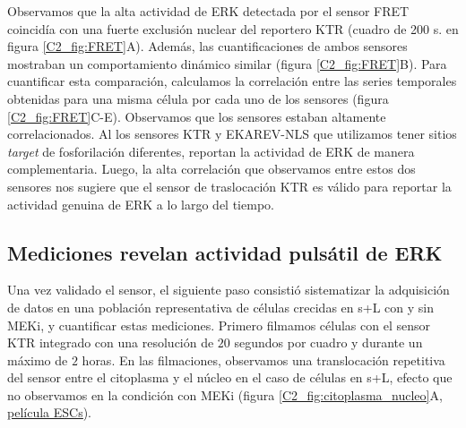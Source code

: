 \documentclass[./main.tex]{subfiles}
\begin{document}
Observamos que la alta actividad de ERK detectada por el sensor FRET coincidía con una fuerte exclusión nuclear del reportero KTR (cuadro de 200 s. en figura \ref{C2_fig:FRET}A). Además, las cuantificaciones de ambos sensores mostraban un comportamiento dinámico similar (figura \ref{C2_fig:FRET}B). Para cuantificar esta comparación, calculamos la correlación entre las series temporales obtenidas para una misma célula por cada uno de los sensores (figura \ref{C2_fig:FRET}C-E). Observamos que los sensores estaban altamente correlacionados. Al los sensores KTR y EKAREV-NLS que utilizamos tener sitios \textit{target} de fosforilación diferentes, reportan la actividad de ERK de manera complementaria. Luego, la alta correlación que observamos entre estos dos sensores nos sugiere que el sensor de traslocación KTR es válido para reportar la actividad genuina de ERK a lo largo del tiempo.  


\subsection{Mediciones revelan actividad pulsátil de ERK}
\label{C2_ssec:tracking}

Una vez validado el sensor, el siguiente paso consistió sistematizar la adquisición de datos en una población representativa de células crecidas en s+L con y sin MEKi, y cuantificar estas mediciones. Primero filmamos células con el sensor KTR integrado con una resolución de $20$ segundos por cuadro y durante un máximo de $2$ horas. En las filmaciones, observamos una translocación repetitiva del sensor entre el citoplasma y el núcleo en el caso de células en s+L, efecto que no observamos en la condición con MEKi (figura \ref{C2_fig:citoplasma_nucleo}A, \href{http://movie.biologists.com/video/10.1242/dev.199710/video-1}{\underline{película ESCs}}). 
\end{document}
